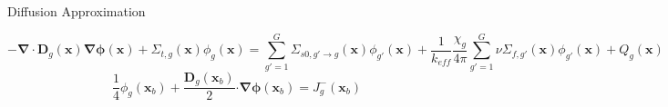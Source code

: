
\begin{frame}[t]{Diffusion Approximation}
  
    \begin{dmath*}\label{e:DiffusionEquation}
        {-\bm\nabla \cdot  \bm D_g\left(\bm x\right)\bm{\nabla} \bm \phi\left(\bm x\right)+ \Sigma_{t,g}\left(\bm x\right)\phi_g\left(\bm x\right) = 
        \sum_{g'=1}^G \Sigma_{s0,g'\rightarrow g}\left(\bm 
        x\right)\phi_{g'}\left(\bm x\right)} + 
        {\frac{1}{k_{eff}}\frac{\chi_g}{4\pi} \sum_{g'=1}^G 
        \nu\Sigma_{f,g'}\left(\bm x\right)\phi_{g'}\left(\bm x\right)} + 
        Q_g\left(\bm x\right)
    \end{dmath*}
    \begin{equation*}\label{e:DiffusionEquationBC}
    \frac{1}{4} \phi_g\left(\bm x_b\right) + \frac{\bm D_g\left(\bm x_b\right)}{2} 
    \bm \cdot \bm \nabla \bm \phi\left(\bm x_b\right) = J^-_g\left(\bm x_b\right)
    \end{equation*}
    
\end{frame}